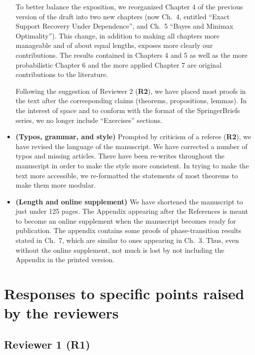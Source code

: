 \documentclass[11pt]{article}
\begin{document}
\begin{itemize}
  To better balance the exposition, we reorganized Chapter 4 of the previous version of the draft into two new chapters (now Ch.\ 4, entitled ``Exact Support Recovery Under Dependence'',  and Ch.\ 5 ``Bayes and Minimax Optimality''). 
  This change, in addition to making all chapters more manageable and of about equal lengths, exposes more clearly our contributions. 
  The results contained in Chapters 4 and 5 as well as the more probabilistic Chapter 6 and the more applied Chapter 7 are original contributions to the literature.
  
  Following the suggestion of Reviewer 2 ({\bf R2}),  we have placed most proofs in the text after the corresponding claims (theorems, propositions, lemmas).  In the interest of space and to conform with the format of the SpringerBriefs series, we no longer include ``Exercises'' sections. 
  
  \item {\bf (Typos, grammar, and style)}  Prompted by criticism of a referee ({\bf R2}), we have revised the language of the manuscript. 
  We have corrected a number of typos and missing articles.   
  There have been re-writes throughout the manuscript in order to make the style more consistent.  
  In trying to make the text more accessible, we re-formatted the statements of most theorems to make them more modular. 

 \item {\bf (Length and online supplement)} We have shortened the manuscript to just under 125 pages. The Appendix appearing after the 
 References is meant to become an online supplement when the manuscript becomes ready for publication.  The appendix contains some proofs of phase-transition results stated in Ch.\ 7, which are similar to ones appearing in Ch.\ 3.%
 Thus, even without the online supplement, not much is lost by not including the Appendix in the printed version. 

  
 \end{itemize}
 
 
 \section{Responses to specific points raised by the reviewers}
 
 \subsection{Reviewer 1 (R1)}
 
\end{document}
